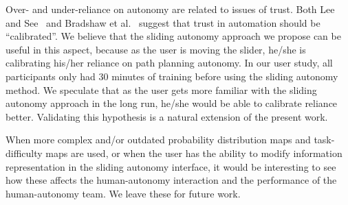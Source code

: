 Over- and under-reliance on autonomy are related to issues of trust.  Both Lee and See~\cite{Lee2004Trust} and Bradshaw et al.\ \cite{Bradshaw2013Seven} suggest that trust in automation should be ``calibrated''. We believe that the sliding autonomy approach we propose can be useful in this aspect, because as the user is moving the slider, he/she is calibrating his/her reliance on path planning autonomy. In our user study, all participants only had 30 minutes of training before using the sliding autonomy method. We speculate that as the user gets more familiar with the sliding autonomy approach in the long run, he/she would be able to calibrate reliance better. Validating this hypothesis is a natural extension of the present work.

When more complex and/or outdated probability distribution maps and task-difficulty maps are used, or when the user has the ability to modify information representation in the sliding autonomy interface, it would be interesting to see how these affects the human-autonomy interaction and the performance of the human-autonomy team. We leave these for future work.


 



